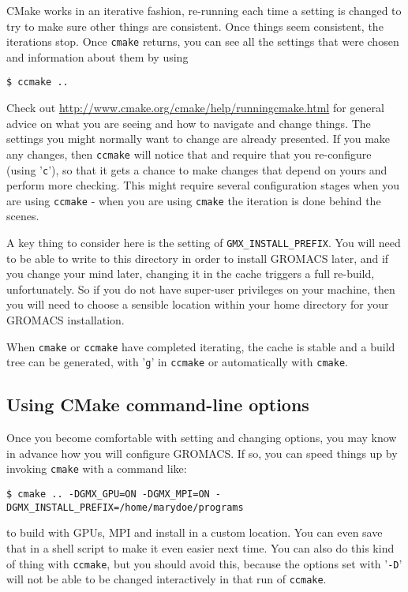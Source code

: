 \documentclass{article}[12pt,a4paper,twoside]
\newcommand{\gromacs}{GROMACS}
\newcommand{\cmake}{CMake}
\begin{document}
\cmake{} works in an iterative fashion, re-running each time a setting
is changed to try to make sure other things are consistent. Once
things seem consistent, the iterations stop. Once \texttt{cmake}
returns, you can see all the settings that were chosen and information
about them by using 
\begin{verbatim}
$ ccmake ..
\end{verbatim}
Check out \url{http://www.cmake.org/cmake/help/runningcmake.html} for
general advice on what you are seeing and how to navigate and change
things. The settings you might normally want to change are already
presented. If you make any changes, then \texttt{ccmake} will notice
that and require that you re-configure (using '\verb+c+'), so that it
gets a chance to make changes that depend on yours and perform more
checking. This might require several configuration stages when you are
using \texttt{ccmake} - when you are using \texttt{cmake} the
iteration is done behind the scenes.

A key thing to consider here is the setting of
\texttt{GMX\_INSTALL\_PREFIX}. You will need to be able to write to this
directory in order to install \gromacs{} later, and if you change your
mind later, changing it in the cache triggers a full re-build,
unfortunately. So if you do not have super-user privileges on your
machine, then you will need to choose a sensible location within your
home directory for your \gromacs{} installation.

When \texttt{cmake} or \texttt{ccmake} have completed iterating, the
cache is stable and a build tree can be generated, with '\verb+g+' in
\texttt{ccmake} or automatically with \texttt{cmake}.

\subsection{Using CMake command-line options}
Once you become comfortable with setting and changing options, you
may know in advance how you will configure GROMACS. If so, you can
speed things up by invoking \texttt{cmake} with a command like:
\begin{verbatim}
$ cmake .. -DGMX_GPU=ON -DGMX_MPI=ON -DGMX_INSTALL_PREFIX=/home/marydoe/programs
\end{verbatim}
to build with GPUs, MPI and install in a custom location. You can even
save that in a shell script to make it even easier next time. You can
also do this kind of thing with \texttt{ccmake}, but you should avoid
this, because the options set with '\verb+-D+' will not be able to be
changed interactively in that run of \texttt{ccmake}.
\end{document}
